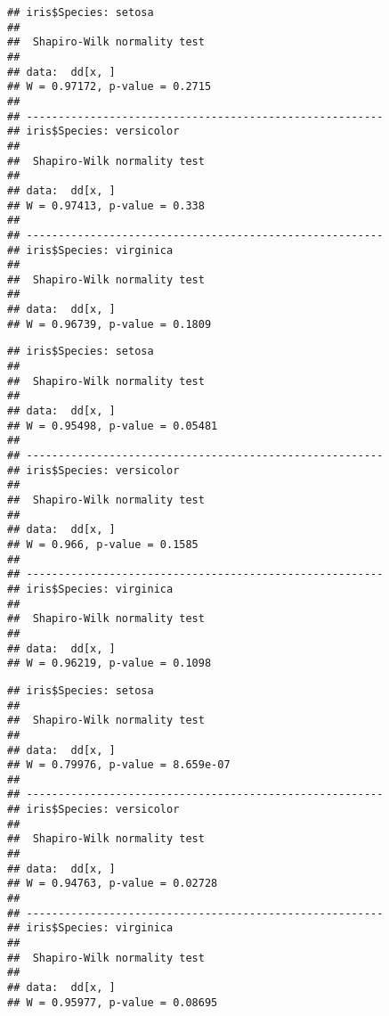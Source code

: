 \documentclass[]{article}
\newenvironment{Shaded}{\begin{snugshade}}{\end{snugshade}}
\newcommand{\KeywordTok}[1]{\textcolor[rgb]{0.13,0.29,0.53}{\textbf{#1}}}
\newcommand{\OperatorTok}[1]{\textcolor[rgb]{0.81,0.36,0.00}{\textbf{#1}}}
\newcommand{\NormalTok}[1]{#1}
\begin{document}
\begin{Shaded}
\end{Shaded}

\begin{verbatim}
## iris$Species: setosa
## 
##  Shapiro-Wilk normality test
## 
## data:  dd[x, ]
## W = 0.97172, p-value = 0.2715
## 
## -------------------------------------------------------- 
## iris$Species: versicolor
## 
##  Shapiro-Wilk normality test
## 
## data:  dd[x, ]
## W = 0.97413, p-value = 0.338
## 
## -------------------------------------------------------- 
## iris$Species: virginica
## 
##  Shapiro-Wilk normality test
## 
## data:  dd[x, ]
## W = 0.96739, p-value = 0.1809
\end{verbatim}

\begin{Shaded}
\end{Shaded}

\begin{verbatim}
## iris$Species: setosa
## 
##  Shapiro-Wilk normality test
## 
## data:  dd[x, ]
## W = 0.95498, p-value = 0.05481
## 
## -------------------------------------------------------- 
## iris$Species: versicolor
## 
##  Shapiro-Wilk normality test
## 
## data:  dd[x, ]
## W = 0.966, p-value = 0.1585
## 
## -------------------------------------------------------- 
## iris$Species: virginica
## 
##  Shapiro-Wilk normality test
## 
## data:  dd[x, ]
## W = 0.96219, p-value = 0.1098
\end{verbatim}

\begin{Shaded}
\end{Shaded}

\begin{verbatim}
## iris$Species: setosa
## 
##  Shapiro-Wilk normality test
## 
## data:  dd[x, ]
## W = 0.79976, p-value = 8.659e-07
## 
## -------------------------------------------------------- 
## iris$Species: versicolor
## 
##  Shapiro-Wilk normality test
## 
## data:  dd[x, ]
## W = 0.94763, p-value = 0.02728
## 
## -------------------------------------------------------- 
## iris$Species: virginica
## 
##  Shapiro-Wilk normality test
## 
## data:  dd[x, ]
## W = 0.95977, p-value = 0.08695
\end{verbatim}
\end{document}
